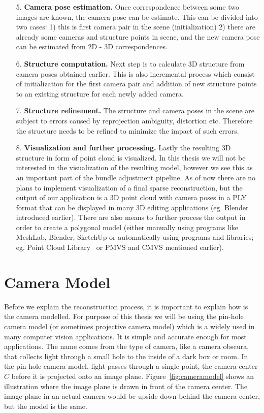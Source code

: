 \begin{itemize}
	\item[5.] \textbf{Camera pose estimation.} Once correspondence between some two images are known, the camera pose can be estimate. This can be divided into two cases: 1) this is first camera pair in the scene (initialization) 2) there are already some cameras and structure points in scene, and the new camera pose can be estimated from 2D - 3D correspondences.
	\item[6.] \textbf{Structure computation.} Next step is to calculate 3D structure from camera poses obtained earlier. This is also incremental process which consist of initialization for the first camera pair and addition of new structure points to an existing structure for each newly added camera.
	\item[7.] \textbf{Structure refinement.} The structure and camera poses in the scene are subject to errors caused by reprojection ambiguity, distortion etc. Therefore the structure needs to be refined to minimize the impact of such errors.
	\item[8.] \textbf{Visualization and further processing.} Lastly the resulting 3D structure in form of point cloud is visualized. In this thesis we will not be interested in the visualization of the resulting model, however we see this as an important part of the bundle adjustment pipeline. As of now there are no plans to implement visualization of a final sparse reconstruction, but the output of our application is a 3D point cloud with camera poses in a PLY format that can be displayed in many 3D editing applications (eg. Blender introduced earlier). There are also means to further process the output in order to create a polygonal model (either manually using programs like MeshLab, Blender, SketchUp or automatically using programs and libraries; eg. Point Cloud Library~\cite{PCL} or PMVS and CMVS mentioned earlier). 
\end{itemize}

\section{Camera Model}
Before we explain the reconstruction process, it is important to explain how is the camera modelled. For purpose of this thesis we will be using the pin-hole camera model (or sometimes projective camera model) which is a widely used in many computer vision applications. It is simple and accurate enough for most applications. The name comes from the type of camera, like a camera obscura, that collects light through a small hole to the inside of a dark box or room. In the pin-hole camera model, light passes through a single point, the camera center $C$ before it is projected onto an image plane. Figure~\ref{fig:cameramodel} shows an illustration where the image plane is drawn in front of the camera center. The image plane in an actual camera would be upside down behind the camera center, but the model is the same.

